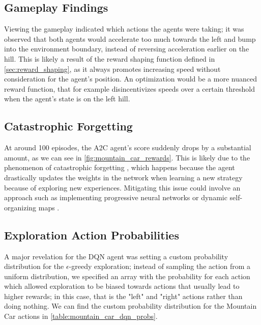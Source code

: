 



\subsection{Gameplay Findings}

Viewing the gameplay indicated which actions the agents were taking; it was
observed that both agents would accelerate too much towards the left and bump
into the environment boundary, instead of reversing acceleration earlier on the
hill. This is likely a result of the reward shaping function defined in
\autoref{sec:reward_shaping}, as it always promotes increasing speed without
consideration for the agent's position. An optimization would be a more nuanced
reward function, that for example disincentivizes speeds over a certain
threshold when the agent's state is on the left hill.

\subsection{Catastrophic Forgetting}

At around 100 episodes, the A2C agent's score suddenly drops by a substantial
amount, as we can see in \autoref{fig:mountain_car_rewards}. This is likely due
to the phenomenon of catastrophic forgetting \cite{parisi2019continual}, which
happens because the agent drastically updates the weights in the network when
learning a new strategy because of exploring new experiences. Mitigating this
issue could involve an approach such as implementing progressive neural
networks \cite{rusu2016progressive} or dynamic self-organizing maps
\cite{lo2019overcoming}.

\subsection{Exploration Action Probabilities}

A major revelation for the DQN agent was setting a custom probability
distribution for the $\epsilon$-greedy exploration; instead of sampling the
action from a uniform distribution, we specified an array with the probability
for each action which allowed exploration to be biased towards actions that
usually lead to higher rewards; in this case, that is the "left" and "right"
actions rather than doing nothing. We can find the custom probability
distribution for the Mountain Car actions in
\autoref{table:mountain_car_dqn_probs}.

